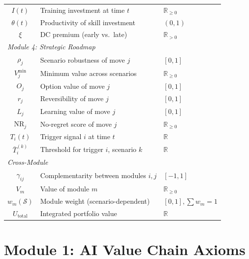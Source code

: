 \begin{table}[htbp]
\begin{tabular}{@{}cll@{}}
$I(t)$ & Training investment at time $t$ & $\mathbb{R}_{\geq 0}$ \\
$\theta(t)$ & Productivity of skill investment & $(0,1)$ \\
$\xi$ & DC premium (early vs.\ late) & $\mathbb{R}_{>0}$ \\
\midrule
\multicolumn{3}{l}{\textit{Module 4: Strategic Roadmap}} \\
$\rho_j$ & Scenario robustness of move $j$ & $[0,1]$ \\
$V_j^{\min}$ & Minimum value across scenarios & $\mathbb{R}_{\geq 0}$ \\
$O_j$ & Option value of move $j$ & $[0,1]$ \\
$r_j$ & Reversibility of move $j$ & $[0,1]$ \\
$L_j$ & Learning value of move $j$ & $[0,1]$ \\
$\text{NR}_j$ & No-regret score of move $j$ & $\mathbb{R}_{\geq 0}$ \\
$T_i(t)$ & Trigger signal $i$ at time $t$ & $\mathbb{R}$ \\
$\bar{T}_i^{(k)}$ & Threshold for trigger $i$, scenario $k$ & $\mathbb{R}$ \\
\midrule
\multicolumn{3}{l}{\textit{Cross-Module}} \\
$\gamma_{ij}$ & Complementarity between modules $i,j$ & $[-1,1]$ \\
$V_m$ & Value of module $m$ & $\mathbb{R}_{\geq 0}$ \\
$w_m(\mathcal{S})$ & Module weight (scenario-dependent) & $[0,1], \sum w_m = 1$ \\
$U_{\text{total}}$ & Integrated portfolio value & $\mathbb{R}$ \\
\bottomrule
\end{tabular}
\end{table}


\section{Module 1: AI Value Chain Axioms}
\label{sec:aim-m1}

